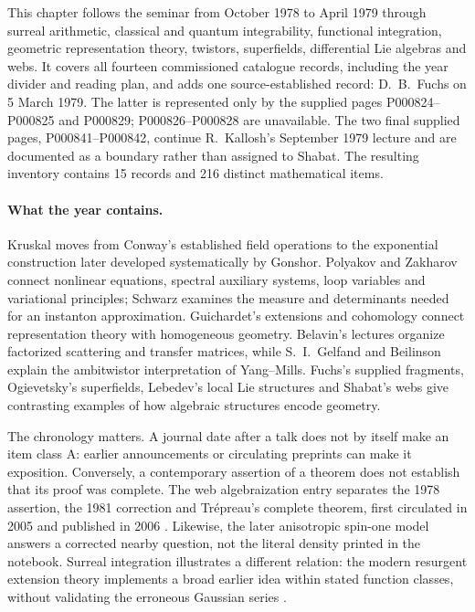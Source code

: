 This chapter follows the seminar from October 1978 to April 1979 through
surreal arithmetic, classical and quantum integrability, functional
integration, geometric representation theory, twistors, superfields,
differential Lie algebras and webs. It covers all fourteen commissioned
catalogue records, including the year divider and reading plan, and adds
one source-established record: D.~B.~Fuchs on 5 March 1979. The latter is
represented only by the supplied pages P000824--P000825 and P000829;
P000826--P000828 are unavailable. The two final supplied pages,
P000841--P000842, continue R.~Kallosh's September 1979 lecture and are
documented as a boundary rather than assigned to Shabat. The resulting
inventory contains 15 records and 216 distinct mathematical items.

\paragraph{What the year contains.}
Kruskal moves from Conway's established field operations to the exponential
construction later developed systematically by Gonshor. Polyakov and
Zakharov connect nonlinear equations, spectral auxiliary systems, loop
variables and variational principles; Schwarz examines the measure and
determinants needed for an instanton approximation. Guichardet's
extensions and cohomology connect representation theory with homogeneous
geometry. Belavin's lectures organize factorized scattering and transfer
matrices, while S.~I.~Gelfand and Beilinson explain the ambitwistor
interpretation of Yang--Mills. Fuchs's supplied fragments, Ogievetsky's
superfields, Lebedev's local Lie structures and Shabat's webs give
contrasting examples of how algebraic structures encode geometry.

The chronology matters. A journal date after a talk does not by itself
make an item class A: earlier announcements or circulating preprints can
make it exposition. Conversely, a contemporary assertion of a theorem
does not establish that its proof was complete. The web algebraization
entry separates the 1978 assertion, the 1981 correction and Tr\'epreau's
complete theorem, first circulated in 2005 and published in 2006
\citep[pp.~78--79]{cherngriffiths1981corrections}
\citep[Thm.~1.1]{trepreau2006algebrisation}.
Likewise, the later anisotropic spin-one model answers a corrected nearby
question, not the literal density printed in the notebook. Surreal
integration illustrates a different relation: the modern resurgent
extension theory implements a broad earlier idea within stated function
classes, without validating the erroneous Gaussian series
\citep[Thms.~78 and 85]{costinehrlich2024integration}.

